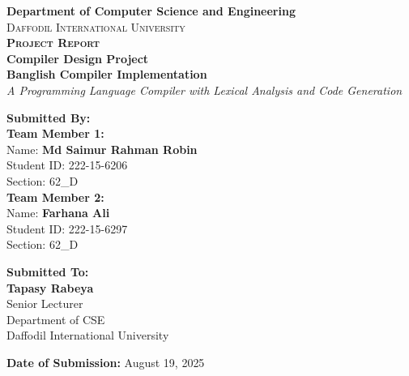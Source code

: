 \documentclass[12pt,a4paper]{article}
\begin{document}
\begin{titlepage}
    \centering
    \vspace*{1cm}
    
    {\Large\textbf{Department of Computer Science and Engineering}}\\[0.4cm]
    {\large\textsc{Daffodil International University}}\\[2cm]
    
    {\huge\bfseries\textsc{Project Report}}\\[0.6cm]
    {\Large\textbf{Compiler Design Project}}\\[1.2cm]
    
    {\LARGE\color{darkblue}\textbf{Banglish Compiler Implementation}}\\[0.4cm]
    {\large\textit{A Programming Language Compiler with Lexical Analysis and Code Generation}}\\[2cm]
    
    \begin{minipage}{0.48\textwidth}
        \begin{flushleft}
            \textbf{Submitted By:}\\[0.2cm]
            \textbf{Team Member 1:}\\
            Name: \textbf{Md Saimur Rahman Robin}\\
            Student ID: 222-15-6206\\
            Section: 62\_D\\[0.3cm]
            \textbf{Team Member 2:}\\
            Name: \textbf{Farhana Ali}\\
            Student ID: 222-15-6297\\
            Section: 62\_D\\
        \end{flushleft}
    \end{minipage}
    \hfill
    \begin{minipage}{0.48\textwidth}
        \begin{flushright}
            \textbf{Submitted To:}\\[0.2cm]
            \textbf{Tapasy Rabeya}\\
            Senior Lecturer\\
            Department of CSE\\
            Daffodil International University\\
        \end{flushright}
    \end{minipage}
    
    \vfill
    
    {\large\textbf{Date of Submission:} August 19, 2025}
    
\end{titlepage}
\end{document}
